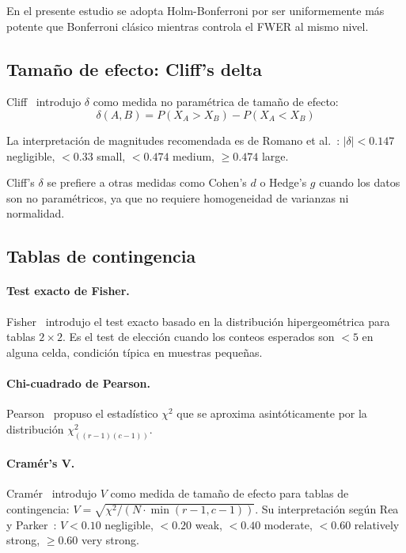 \documentclass[12pt,a4paper,oneside]{book}
\begin{document}
En el presente estudio se adopta Holm-Bonferroni por ser uniformemente más potente que Bonferroni clásico mientras controla el FWER al mismo nivel.

\subsection{Tamaño de efecto: Cliff's delta}

Cliff~\cite{Cliff1993,Cliff1996} introdujo $\delta$ como medida no paramétrica de tamaño de efecto:
\begin{equation}
\delta(A,B) = P(X_A > X_B) - P(X_A < X_B)
\end{equation}

La interpretación de magnitudes recomendada es de Romano et al.~\cite{Romano2006}: $|\delta| < 0.147$ negligible, $< 0.33$ small, $< 0.474$ medium, $\geq 0.474$ large.

Cliff's $\delta$ se prefiere a otras medidas como Cohen's $d$ o Hedge's $g$ cuando los datos son no paramétricos, ya que no requiere homogeneidad de varianzas ni normalidad.

\subsection{Tablas de contingencia}

\paragraph{Test exacto de Fisher.} Fisher~\cite{Fisher1922} introdujo el test exacto basado en la distribución hipergeométrica para tablas $2 \times 2$. Es el test de elección cuando los conteos esperados son $< 5$ en alguna celda, condición típica en muestras pequeñas.

\paragraph{Chi-cuadrado de Pearson.} Pearson~\cite{Pearson1900} propuso el estadístico $\chi^2$ que se aproxima asintóticamente por la distribución $\chi^2_{((r-1)(c-1))}$.

\paragraph{Cramér's V.} Cramér~\cite{Cramer1946} introdujo $V$ como medida de tamaño de efecto para tablas de contingencia: $V = \sqrt{\chi^2 / (N \cdot \min(r-1,c-1))}$. Su interpretación según Rea y Parker~\cite{Rea1992}: $V<0.10$ negligible, $<0.20$ weak, $<0.40$ moderate, $<0.60$ relatively strong, $\geq 0.60$ very strong.
\end{document}

